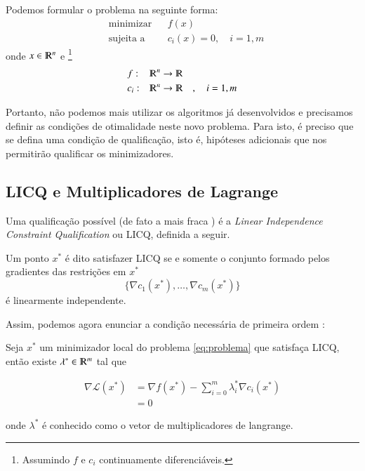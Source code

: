 Podemos formular o problema na seguinte forma:
\begin{equation}
    \label{eq:problema}
    \begin{aligned}
        & \text{minimizar} & & f(x) \\
        & \text{sujeita a} & & c_i(x) = 0, \quad i = 1, m
    \end{aligned}
\end{equation}
onde $x  \in \varmathbb{R}^n $ e \footnote{Assumindo $f$ e $c_i$ continuamente diferenciáveis.}
\begin{equation*}
    \begin{aligned}
        & f: & \varmathbb{R}^n \rightarrow \varmathbb{R} & &  \\
        & c_i: & \varmathbb{R}^n \rightarrow \varmathbb{R} & & ,\quad  i = 1, m
    \end{aligned}
\end{equation*}

Portanto, não podemos mais utilizar os algoritmos já desenvolvidos e precisamos
definir as condições de otimalidade neste novo problema. Para isto, é preciso
que se defina uma condição de qualificação, isto é, hipóteses adicionais que nos
permitirão qualificar os minimizadores.

\newpage
\subsection{LICQ e Multiplicadores de Lagrange}
    Uma qualificação possível (de fato a mais fraca \citep{Wachsmuth201378}) é a
    \emph{Linear Independence Constraint Qualification} ou LICQ, definida a seguir.

    \begin{definition}
        Um ponto $x^*$ é dito satisfazer LICQ se e somente o conjunto formado pelos
        gradientes das restrições em $x^*$
        $$ \{ \nabla c_1(x^*), \dots, \nabla c_m(x^*)\} $$
        é linearmente independente.
    \end{definition}

    Assim, podemos agora enunciar a condição necessária de primeira ordem \citep{Friedlander94}:

    \begin{theorem}
        Seja $x^*$ um minimizador local do problema \ref{eq:problema} que satisfaça LICQ,
        então existe $\lambda^* \in \varmathbb{R}^m$ tal que

        \begin{equation}
            \label{eq:parada}
            \begin{aligned}
                \nabla \mathcal{L}(x^*) &= \nabla f(x^*) - \sum_{i = 0}^{m} \lambda_i^* \nabla c_i(x^*) \\
                                      &= 0
            \end{aligned}
        \end{equation}

        onde $\lambda^*$ é conhecido como o vetor de multiplicadores de langrange.
    \end{theorem}

